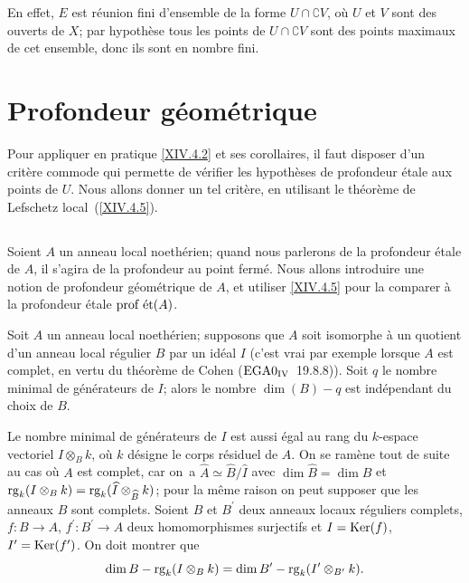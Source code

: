 En effet, $E$ est r\'eunion fini d'ensemble de la forme $U\cap\complement V$, o\`u $U$ et $V$ sont des ouverts de $X$; par hypoth\`ese tous les points de $U\cap\complement V$ sont des points maximaux de cet ensemble, donc ils sont en nombre fini.

\section{Profondeur g\'eom\'etrique} \label{XIV.5}

Pour appliquer en pratique \ref{XIV.4.2} et ses corollaires, il faut disposer d'un crit\`ere commode qui permette de v\'erifier les hypoth\`eses de profondeur \'etale aux points de $U$. Nous allons donner un tel crit\`ere, en utilisant le th\'eor\`eme de Lefschetz local~(\ref{XIV.4.5}).

\subsection{} \label{XIV.5.1} Soient $A$ un anneau local noeth\'erien; quand nous parlerons de la profondeur \'etale de $A$, il s'agira de la profondeur au point ferm\'e. Nous allons introduire une notion de \og profondeur g\'eom\'etrique de $A$\fg, et utiliser \ref{XIV.4.5} pour la comparer \`a la profondeur \'etale $\operatorname{prof\;\acute{e}t}(A)$.

\begin{proposition} \label{XIV.5.2} Soit $A$ un anneau local noeth\'erien; supposons que $A$ soit isomorphe \`a un quotient d'un anneau local r\'egulier $B$ par un id\'eal $I$ (c'est vrai par exemple lorsque $A$ est complet, en vertu du th\'eor\`eme de Cohen (\textup{$\textup{EGA}\space 0_{\textup{IV}}$~19.8.8})). Soit $q$ le nombre minimal de g\'en\'erateurs de $I$; alors le nombre $\dim(B)-q$ est ind\'ependant du choix de $B$.
\end{proposition}

Le nombre minimal de g\'en\'erateurs de $I$ est aussi \'egal au rang du $k$-espace vectoriel $I\otimes_{B}k$, o\`u $k$ d\'esigne le corps r\'esiduel de $A$. On se ram\`ene tout de suite au cas o\`u $A$ est complet, car on~a $\widehat{A}\simeq\widehat{B}/\widehat{I}$ avec $\dim \widehat{B}=\dim B$ et $\operatorname{rg}_{k}(I\otimes_{B}k)=\operatorname{rg}_{k}(\widehat{I}\otimes_{\widehat{B}}k)$; pour la m\^eme raison on peut supposer que les anneaux $B$ sont complets. Soient $B$ et $B^{\prime}$ deux anneaux locaux r\'eguliers complets, $f\colon B\to A$, $f^{\prime}\colon B^{\prime}\to A$ deux homomorphismes surjectifs et $I=\operatorname{Ker}(f)$, $I^{\prime}=\operatorname{Ker}(f^{\prime})$. On doit montrer que
$$
\dim B-\operatorname{rg}_{k}(I\otimes_{B}k)=\dim B^{\prime}-\operatorname{rg}_{k}(I^{\prime}\otimes_{B^{\prime}}k).
$$

